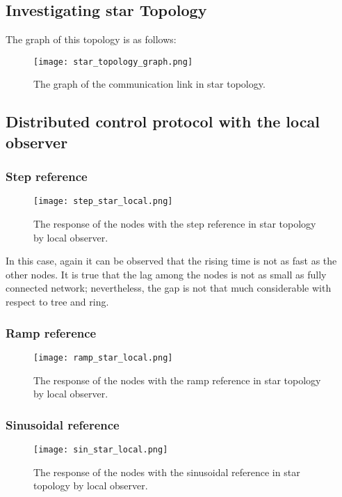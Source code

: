 \subsection{Investigating star Topology}
The graph of this topology is as follows:
\begin{figure}[H] %
    \centering
    \texttt{[image: star\_topology\_graph.png]} %
    \caption{The graph of the communication link in star topology.}
\end{figure}

\subsection{Distributed control protocol with the local observer}
\subsubsection{Step reference}
\begin{figure}[H] %
    \centering
    \texttt{[image: step\_star\_local.png]} %
    \caption{The response of the nodes with the step reference in star topology by local observer.}
\end{figure}
In this case, again it can be observed that the rising time is not as fast as the other nodes. It is true that  the lag among the nodes is not as small as fully connected network; nevertheless, the gap is not that much considerable with respect to tree and ring.

\subsubsection{Ramp reference}
\begin{figure}[H] %
    \centering
    \texttt{[image: ramp\_star\_local.png]} %
    \caption{The response of the nodes with the ramp reference in star topology by local observer.}
\end{figure}

\subsubsection{Sinusoidal reference}
\begin{figure}[H] %
    \centering
    \texttt{[image: sin\_star\_local.png]} %
    \caption{The response of the nodes with the sinusoidal reference in star topology by local observer.}
\end{figure}

